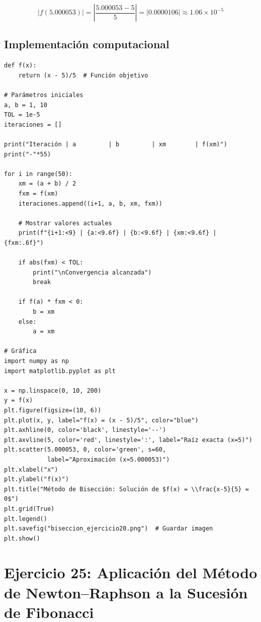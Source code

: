 \documentclass[12pt]{article}
\begin{document}
\[
|f(5.000053)| = \left|\frac{5.000053 - 5}{5}\right| = \left|0.0000106\right| \approx 1.06 \times 10^{-5}
\]

\subsection*{Implementación computacional}

\begin{tcolorbox}[title=Código Python: Método de Bisección,
                  colback=white,
                  colframe=black,
                  breakable,
                  enhanced]

\begin{lstlisting}[style=mypython]
def f(x):
    return (x - 5)/5  # Función objetivo

# Parámetros iniciales
a, b = 1, 10
TOL = 1e-5
iteraciones = []

print("Iteración | a         | b         | xm        | f(xm)")
print("-"*55)

for i in range(50):
    xm = (a + b) / 2
    fxm = f(xm)
    iteraciones.append((i+1, a, b, xm, fxm))
    
    # Mostrar valores actuales
    print(f"{i+1:<9} | {a:<9.6f} | {b:<9.6f} | {xm:<9.6f} | {fxm:.6f}")
    
    if abs(fxm) < TOL:
        print("\nConvergencia alcanzada")
        break
    
    if f(a) * fxm < 0:
        b = xm
    else:
        a = xm

# Gráfica
import numpy as np
import matplotlib.pyplot as plt

x = np.linspace(0, 10, 200)
y = f(x)
plt.figure(figsize=(10, 6))
plt.plot(x, y, label="f(x) = (x - 5)/5", color="blue")
plt.axhline(0, color='black', linestyle='--')
plt.axvline(5, color='red', linestyle=':', label="Raíz exacta (x=5)")
plt.scatter(5.000053, 0, color='green', s=60, 
            label="Aproximación (x≈5.000053)")
plt.xlabel("x")
plt.ylabel("f(x)")
plt.title("Método de Bisección: Solución de $f(x) = \\frac{x-5}{5} = 0$")
plt.grid(True)
plt.legend()
plt.savefig("biseccion_ejercicio20.png")  # Guardar imagen
plt.show()
\end{lstlisting}
\end{tcolorbox}




\section*{Ejercicio 25: Aplicación del Método de Newton–Raphson a la Sucesión de Fibonacci}
\end{document}
